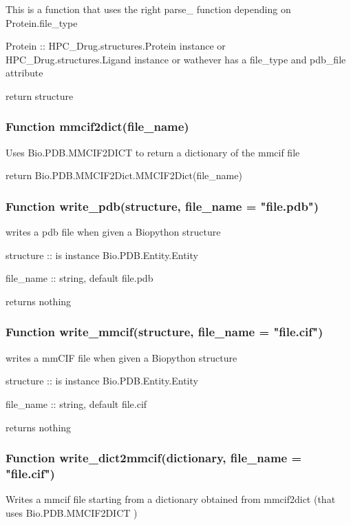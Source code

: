         This is a function that uses the right
        parse\_{} function depending on Protein.file\_type

        Protein :: HPC\_Drug.structures.Protein instance or HPC\_Drug.structures.Ligand instance or wathever has a file\_type and pdb\_file attribute
        
        return structure
    
	\subsubsection{Function mmcif2dict(file\_name)}
        
        Uses Bio.PDB.MMCIF2DICT to return a dictionary of the mmcif file

        return Bio.PDB.MMCIF2Dict.MMCIF2Dict(file\_name)

    \subsubsection{Function write\_pdb(structure, file\_name = "file.pdb")}
        
        writes a pdb file when given a Biopython structure

        structure :: is instance Bio.PDB.Entity.Entity

        file\_name :: string, default file.pdb

        returns nothing

    \subsubsection{Function write\_mmcif(structure, file\_name = "file.cif")}
        
        writes a mmCIF file when given a Biopython structure

        structure :: is instance Bio.PDB.Entity.Entity

        file\_name :: string, default file.cif

        returns nothing

    \subsubsection{Function write\_dict2mmcif(dictionary, file\_name = "file.cif")}
        
        Writes a mmcif file starting from a dictionary
        obtained from mmcif2dict (that uses Bio.PDB.MMCIF2DICT )

